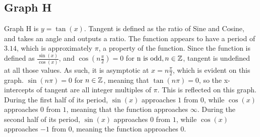 \subsection{Graph H}

Graph H is $y=\tan(x)$.
Tangent is defined as the ratio of Sine and Cosine, and takes an angle and outputs a ratio.
The function appears to have a period of $3.14$, which is approximately $\pi$, a property of the function.
Since the function is defined as $\frac{\sin(x)}{\cos(x)}$, and ${\cos(n{\frac{\pi}{2}})=0}$ for ${\text{n is odd}, n\in \mathbb{Z}}$, tangent is undefined at all those values.
As such, it is asymptotic at $x={n{\frac{\pi}{2}}}$, which is evident on this graph.
${\sin(n\pi)=0}$ for ${n \in \mathbb{Z}}$, meaning that ${\tan(n{\pi})=0}$, so the x-intercepts of tangent are all integer multiples of ${\pi}$.
This is reflected on this graph.
During the first half of its period, ${\sin(x)}$ approaches $1$ from $0$, while ${\cos(x)}$ approaches $0$ from $1$, meaning that the function approaches $\infty$.
During the second half of its period, ${\sin(x)}$ approaches $0$ from $1$, while ${\cos(x)}$ approaches $-1$ from $0$, meaning the function approaches $0$.
